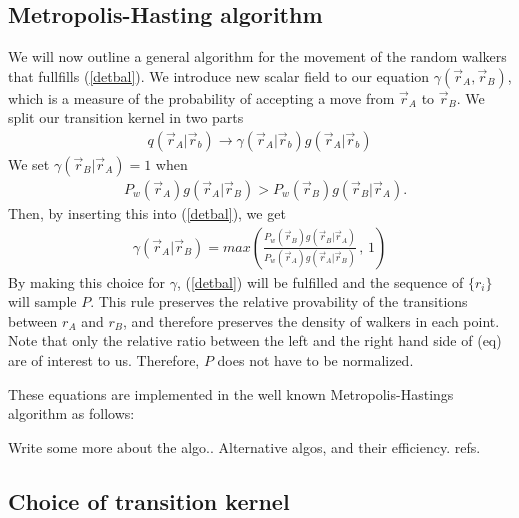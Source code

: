 \documentclass[a4paper,10pt,twocolumn]{article} %
\begin{document}
\subsection{Metropolis-Hasting algorithm}%
We will now outline a general algorithm for the movement of the random walkers that fullfills (\ref{detbal}).
We introduce new scalar field to our equation $\gamma(\vec r_A,\vec r_B)$, which is a measure of the 
probability of accepting a move from $\vec r_A$ to $\vec r_B$.
We split our transition kernel in two parts
\begin{align}
	q(\vec r_A|\vec r_b) 
		\to 
	\gamma(\vec r_A|\vec r_b)
	g(\vec r_A|\vec r_b)
\end{align} 
We set $\gamma(\vec r_B|\vec r_A)=1$ when
\begin{align}
    &P_w(\vec r_A) g(\vec r_A|\vec r_B)  >  P_w(\vec r_B) g(\vec r_B|\vec r_A).
\end{align}
Then, by inserting this into (\ref{detbal}), we get
\begin{align} 
	\gamma(\vec r_A|\vec r_B)=max\left(
	\frac
	{P_w(\vec r_B) g(\vec r_B|\vec r_A)}
    {P_w(\vec r_A) g(\vec r_A|\vec r_B)}\, 
	,\, 1 \right)
\end{align}
By making this choice for $\gamma$, (\ref{detbal}) will be fulfilled and the sequence of $\{r_i\}$ will sample 
$P$. This rule preserves the relative provability of the transitions between $r_A$ and $r_B$, and therefore preserves the 
density of walkers in each point.  Note that only the relative ratio between the left and the right hand side of (eq) are of interest to us. Therefore, $P$ does not have to be normalized. 

These equations are implemented in the well known Metropolis-Hastings algorithm as follows:
\begin{algorithmic}
\LOOP{}
\ELSE
{}
\ENDIF{}
\ENDLOOP{}
\end{algorithmic}
Write some more about the algo..
Alternative algos, and their efficiency. refs.


\subsection{Choice of transition kernel} %
\end{document}
